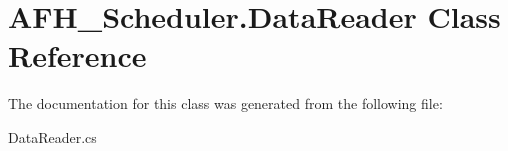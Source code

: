 \section{A\+F\+H\+\_\+\+Scheduler.\+Data\+Reader Class Reference}
\label{class_a_f_h___scheduler_1_1_data_reader}


The documentation for this class was generated from the following file\+:\begin{DoxyCompactItemize}
\item 
Data\+Reader.\+cs\end{DoxyCompactItemize}
